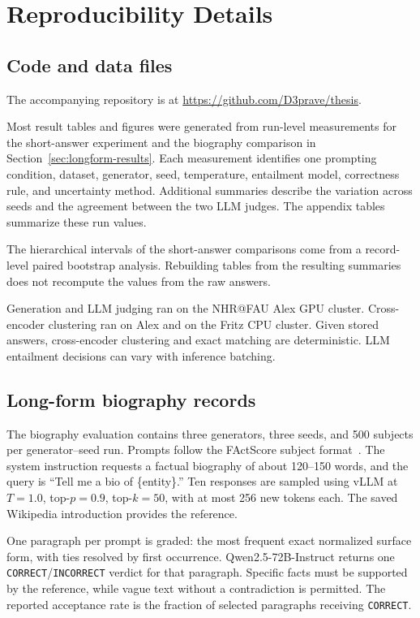 \chapter{Reproducibility Details}
\label{app:method-details}

\section{Code and data files}
\label{app:schema}
\label{app:reproducibility}

The accompanying repository is at \url{https://github.com/D3prave/thesis}.

Most result tables and figures were generated from run-level measurements
for the short-answer experiment and the biography comparison in
Section~\ref{sec:longform-results}. Each measurement identifies one prompting
condition, dataset, generator, seed, temperature, entailment model,
correctness rule, and uncertainty method. Additional summaries describe the
variation across seeds and the agreement between the two LLM judges. The appendix tables
summarize these run values.

The hierarchical intervals of the short-answer comparisons come from a
record-level paired bootstrap analysis. Rebuilding tables from the resulting
summaries does not recompute the values from the raw answers.

Generation and LLM judging ran on the NHR@FAU Alex GPU cluster. Cross-encoder
clustering ran on Alex and on the Fritz CPU cluster. Given stored answers,
cross-encoder clustering and exact matching are deterministic. LLM entailment
decisions can vary with inference batching.

\section{Long-form biography records}
\label{app:longform-details}

The biography evaluation contains three generators, three seeds, and
500 subjects per generator--seed run. Prompts follow the FActScore subject
format~\cite{min_factscore_2023}. The system instruction requests a factual
biography of about 120--150 words, and the query is ``Tell me a bio of
\{entity\}.'' Ten responses are sampled using vLLM at $T=1.0$, top-$p=0.9$,
top-$k=50$, with at most 256 new tokens each. The saved Wikipedia introduction
provides the reference.

One paragraph per prompt is graded: the most frequent exact normalized
surface form, with ties resolved by first occurrence. Qwen2.5-72B-Instruct
returns one \texttt{CORRECT}/\texttt{INCORRECT} verdict for that paragraph.
Specific facts must be supported by the reference, while vague text without a
contradiction is permitted. The reported acceptance rate is the fraction of
selected paragraphs receiving \texttt{CORRECT}.

